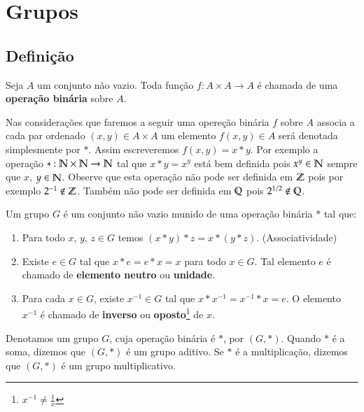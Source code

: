 \chapter{Grupos}

\section{Defini{\c c}{\~a}o}

\begin{definicao}
   Seja $A$ um conjunto não vazio. Toda função $f : A \times A \to A$ é chamada de uma \textbf{operação binária} sobre $A$.
\end{definicao}

Nas considerações que faremos a seguir uma opereção binária $f$ sobre $A$ associa a cada par ordenado $(x, y) \in A \times A$ um elemento $f(x, y) \in A$ será denotada simplesmente por $*$. Assim escreveremos $f(x, y) = x*y$. Por exemplo a operação $* : \mathbb{N} \times \mathbb{N} \to \mathbb{N}$ tal que $x*y = x^y$ está bem definida pois $x^y \in \mathbb{N}$ sempre que $x$, $y \in \mathbb{N}$. Observe que esta operação não pode ser definida em $\mathbb{Z}$ pois por exemplo $2^{-1} \notin \mathbb{Z}$. Também não pode ser definida em $\mathbb{Q}$ pois $2^{1/2} \notin \mathbb{Q}$.

\begin{definicao}[Grupo] Um grupo $G$ {\'e} um conjunto n{\~a}o vazio munido de uma opera{\c c}{\~a}o bin{\'a}ria $*$ tal que:
\begin{enumerate}
\item Para todo $x$, $y$, $z\in G$ temos $(x*y)*z=x*(y*z)$. (Associatividade)
\item Existe $e\in G$ tal que $x*e = e*x = x$ para todo $x\in G$. Tal elemento $e$ {\'e} chamado de \textbf{elemento neutro} ou \textbf{unidade}.
\item Para cada $x\in G$, existe $x^{-1}\in G$ tal que $x*x^{-1} = x^{-1}*x = e$. O elemento $x^{-1}$ {\'e} chamado de \textbf{inverso} ou \textbf{oposto}\footnote{$x^{-1}\neq\displaystyle\frac{1}{x}$} de $x$.
\end{enumerate}
\end{definicao}

Denotamos um grupo $G$, cuja opera{\c c}{\~a}o bin{\'a}ria {\'e} $*$, por $(G,*)$. Quando $*$ {\'e} a soma, dizemos que $(G,*)$ {\'e} um grupo aditivo. Se $*$ {\'e} a multiplica{\c c}{\~a}o, dizemos que $(G,*)$ {\'e} um grupo multiplicativo.\\

